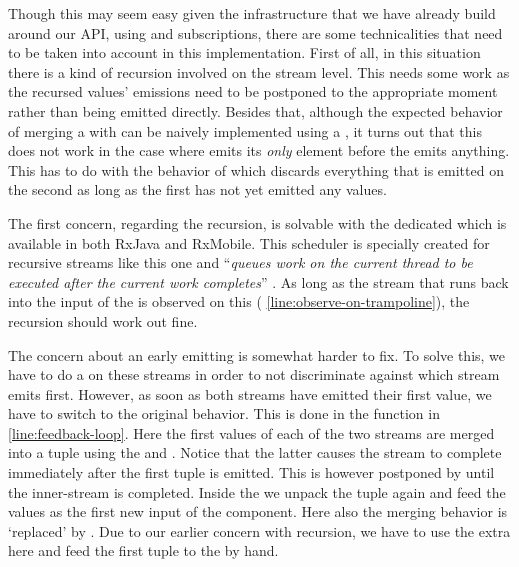 Though this may seem easy given the infrastructure that we have already build around our API, using  and subscriptions, there are some technicalities that need to be taken into account in this implementation. First of all, in this situation there is a kind of recursion involved on the stream level. This needs some work as the recursed values' emissions need to be postponed to the appropriate moment rather than being emitted directly. Besides that, although the expected behavior of merging a \comp with  can be naively implemented using a , it turns out that this does not work in the case where  emits its \emph{only} element before the \comp emits anything. This has to do with the behavior of  which discards everything that is emitted on the second \obs as long as the first \obs has not yet emitted any values.

The first concern, regarding the recursion, is solvable with the dedicated  which is available in both RxJava and RxMobile. This scheduler is specially created for recursive streams like this one and ``\textit{queues work on the current thread to be executed after the current work completes}'' . As long as the stream that runs back into the input of the \comp is observed on this \sch ( \cref{line:observe-on-trampoline}), the recursion should work out fine.

The concern about an early emitting  is somewhat harder to fix. To solve this, we have to do a  on these streams in order to not discriminate against which stream emits first. However, as soon as both streams have emitted their first value, we have to switch to the original  behavior. This is done in the function  in  \cref{line:feedback-loop}. Here the first values of each of the two streams are merged into a tuple using the  and . Notice that the latter causes the stream to complete immediately after the first tuple is emitted. This  is however postponed by  until the inner-stream is completed. Inside the  we unpack the tuple again and feed the values as the first new input of the  component. Here also the merging behavior is `replaced' by . Due to our earlier concern with recursion, we have to use the extra  here and feed the first tuple to the  by hand.

